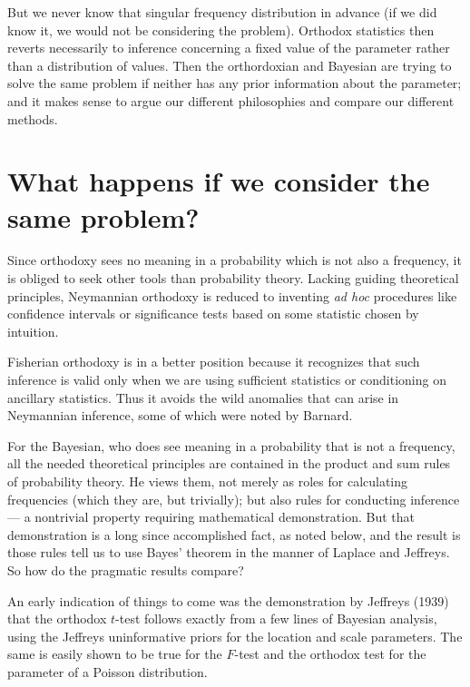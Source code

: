 \documentclass[12pt]{article}
\begin{document}
But we never know that singular frequency distribution in advance (if we did know it, we would not be considering the problem). Orthodox statistics then reverts necessarily to inference concerning a fixed value of the parameter rather than a distribution of values. Then the orthordoxian and Bayesian are trying to solve the same problem if neither has any prior information about the parameter; and it makes sense to argue our different philosophies and compare our different methods.

\section{What happens if we consider the same problem?}

Since orthodoxy sees no meaning in a probability which is not also a frequency, it is obliged to seek other tools than probability theory. Lacking guiding theoretical principles, Neymannian orthodoxy is reduced to inventing \emph{ad hoc} procedures like confidence intervals or significance tests based on some statistic chosen by intuition.

Fisherian orthodoxy is in a better position because it recognizes that such inference is valid only when we are using sufficient statistics or conditioning on ancillary statistics. Thus it avoids the wild anomalies that can arise in Neymannian inference, some of which were noted by Barnard.

For the Bayesian, who does see meaning in a probability that is not a frequency, all the needed theoretical principles are contained in the product and sum rules of probability theory. He views them, not merely as roles for calculating frequencies (which they are, but trivially); but also rules for conducting inference --- a nontrivial property requiring mathematical demonstration. But that demonstration is a long since accomplished fact, as noted below, and the result is those rules tell us to use Bayes' theorem in the manner of Laplace and Jeffreys. So how do the pragmatic results compare?

An early indication of things to come was the demonstration by Jeffreys (1939) that the orthodox $t$-test follows exactly from a few lines of Bayesian analysis, using the Jeffreys uninformative priors for the location and scale parameters. The same is easily shown to be true for the $F$-test and the orthodox test for the parameter of a Poisson distribution.
\end{document}
